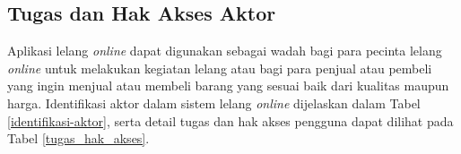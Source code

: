 \subsection{Tugas dan Hak Akses Aktor}
	\label{identifikasi_pengguna}

	\indent Aplikasi lelang \textit{online} dapat digunakan sebagai wadah bagi para pecinta lelang \textit{online} untuk melakukan kegiatan lelang atau bagi para penjual atau pembeli yang ingin menjual atau membeli barang yang sesuai baik dari kualitas maupun harga. Identifikasi aktor dalam sistem lelang \textit{online} dijelaskan dalam Tabel \ref{identifikasi-aktor}, serta detail tugas dan hak akses pengguna dapat dilihat pada Tabel \ref{tugas_hak_akses}.
	
	
	
	
	 
